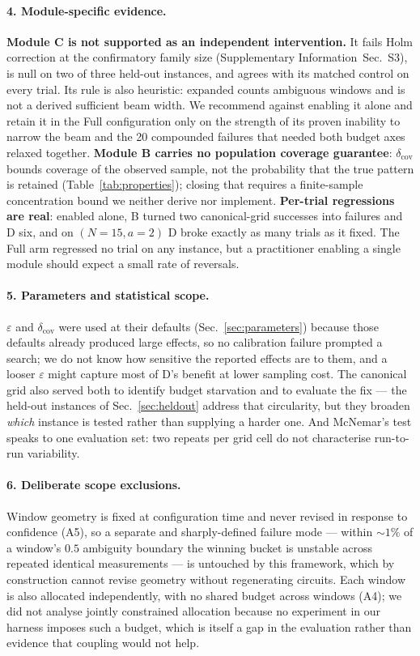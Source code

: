 \documentclass[preprint,11pt]{elsarticle}
\newcommand{\SI}{Supplementary Information}
\newcommand{\SItables}{\SI{}~Sec.~S3}
\newcommand{\dcov}{\delta_{\mathrm{cov}}}
\begin{document}
\paragraph{4. Module-specific evidence.}
\textbf{Module C is not supported as an independent intervention.} It
fails Holm correction at the confirmatory family size
(\SItables{}), is null on two of three held-out instances, and
agrees with its matched control on every trial. Its rule is also
heuristic: $\mathrm{expanded}$ counts ambiguous windows and is not a
derived sufficient beam width. We recommend against enabling it alone and
retain it in the Full configuration only on the strength of its proven
inability to narrow the beam and the 20 compounded failures that needed
both budget axes relaxed together. \textbf{Module B carries no population
coverage guarantee}: $\dcov$ bounds coverage of the observed sample, not
the probability that the true pattern is retained
(Table~\ref{tab:properties}); closing that requires a finite-sample
concentration bound we neither derive nor implement. \textbf{Per-trial
regressions are real}: enabled alone, B turned two canonical-grid
successes into failures and D six, and on $(N{=}15,a{=}2)$ D broke
exactly as many trials as it fixed. The Full arm regressed no trial on
any instance, but a practitioner enabling a single module should expect a
small rate of reversals.

\paragraph{5. Parameters and statistical scope.}
$\varepsilon$ and $\dcov$ were used at their defaults
(Sec.~\ref{sec:parameters}) because those defaults already produced large
effects, so no calibration failure prompted a search; we do not know how
sensitive the reported effects are to them, and a looser $\varepsilon$
might capture most of D's benefit at lower sampling cost. The canonical
grid also served both to identify budget starvation and to evaluate the
fix --- the held-out instances of Sec.~\ref{sec:heldout} address that
circularity, but they broaden \emph{which} instance is tested rather than
supplying a harder one. And McNemar's test speaks to one evaluation set:
two repeats per grid cell do not characterise run-to-run variability.

\paragraph{6. Deliberate scope exclusions.}
Window geometry is fixed at configuration time and never revised in
response to confidence (A5), so a separate and sharply-defined failure
mode --- within ${\sim}1\%$ of a window's $0.5$ ambiguity boundary the
winning bucket is unstable across repeated identical measurements --- is
untouched by this framework, which by construction cannot revise geometry
without regenerating circuits. Each window is also allocated
independently, with no shared budget across windows (A4); we did not
analyse jointly constrained allocation because no experiment in our
harness imposes such a budget, which is itself a gap in the evaluation
rather than evidence that coupling would not help.
\end{document}
